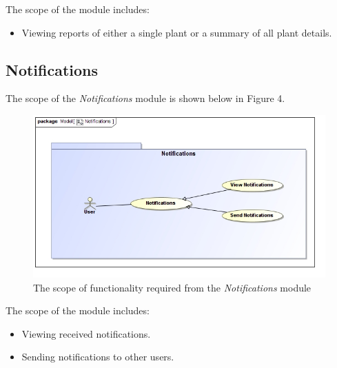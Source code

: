 \documentclass{article}
\begin{document}
		The scope of the \emph{} module includes:
		
		\begin{itemize}
			\item Viewing reports of either a single plant or a summary of all plant details.
		\end{itemize}
		
	\pagebreak
	\subsection{Notifications}
		The scope of the \emph{Notifications} module is shown below in Figure 4.
		
		\begin{figure}[H]
			\centering
			\includegraphics[width=\textwidth]{../software-architecture-specification/Notifications.jpg}
			\caption{The scope of functionality required from the \emph{Notifications} module}
		\end{figure}
		
		The scope of the \emph{} module includes:
		
		\begin{itemize}
			\item Viewing received notifications.
			\item Sending notifications to other users.
		\end{itemize}
\end{document}
